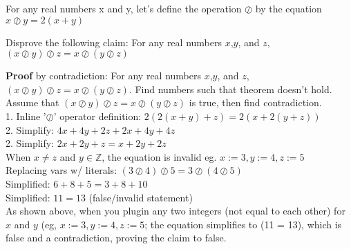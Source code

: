 \documentclass[solution,letterpaper]{cs20}
\begin{document}
    \begin{problem}
        For any real numbers x and y, let's define the operation $\oslash$ by the equation
        $x\oslash y=2(x+y)$

        \bigskip \noindent Disprove the following claim: For any real numbers $x$,$y$, and $z$, $(x\oslash y)\oslash z=x\oslash (y\oslash z)$

        \begin{solution}
            \textbf{Proof} by contradiction: For any real numbers $x$,$y$, and $z$, $(x\oslash y)\oslash z=x\oslash (y\oslash z)$. Find numbers such that theorem doesn't hold. \\

            Assume that $(x\oslash y)\oslash z=x\oslash (y\oslash z)$ is true, then find contradiction. \\

            1. Inline '$\oslash$' operator definition: $2(2(x+y) + z) = 2(x + 2(y + z))$ \\
            2. Simplify: $4x + 4y + 2z + 2x + 4y + 4z$ \\
            2. Simplify: $2x + 2y + z = x + 2y + 2z$ \\

            When $x \neq z$ and $y \in \mathbb{Z}$, the equation is invalid eg. $x := 3, y := 4, z := 5$ \\
            Replacing vars w/ literals: $(3 \oslash 4) \oslash 5 = 3 \oslash (4 \oslash 5)$ \\
            Simplified: $6 + 8 + 5 = 3 + 8 + 10$ \\
            Simplified: $11 = 13$ (false/invalid statement) \\

            As shown above, when you plugin any two integers (not equal to each other) for $x$ and $y$ (eg, $x:=3, y:=4, z:=5$; the equation simplifies to (11 = 13), which is false and a contradiction, proving the claim to false.
        \end{solution}
    \end{problem}
    \newpage
\end{document}
